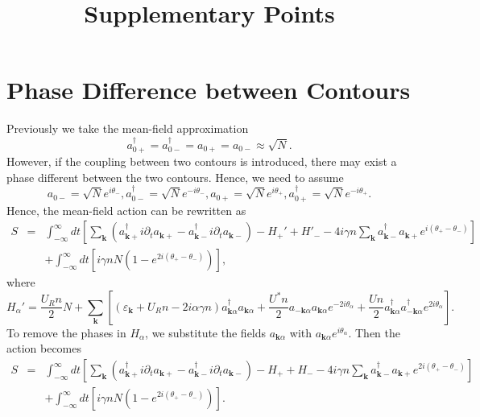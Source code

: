 \documentclass[aps,onecolumn,superscriptaddress,notitlepage,longbibliography]{revtex4-1}
\newcommand{\tmmathbf}[1]{\ensuremath{\boldsymbol{#1}}}
\begin{document}
\title{Supplementary Points}

\maketitle

\section{Phase Difference between Contours}

Previously we take the mean-field approximation
\begin{equation}
  a_{0 +}^{\dagger} = a_{0 -}^{\dagger} = a_{0 +} = a_{0 -} \approx \sqrt{N} .
\end{equation}
However, if the coupling between two contours is introduced, there may exist a
phase different between the two contours. Hence, we need to assume
\begin{equation}
  a_{0 -} = \sqrt{N} e^{i \theta_-}, a_{0 -}^{\dagger} = \sqrt{N} e^{- i
  \theta_-}, a_{0 +} = \sqrt{N} e^{i \theta_+}, a_{0 +}^{\dagger} = \sqrt{N}
  e^{- i \theta_+} .
\end{equation}
Hence, the mean-field action can be rewritten as
\begin{eqnarray}
  S & = & \int_{- \infty}^{\infty} d t \left[ \sum_{\tmmathbf{k}}
  (a^{\dagger}_{\tmmathbf{k}+} i \partial_t a_{\tmmathbf{k}+} -
  a^{\dagger}_{\tmmathbf{k}-} i \partial_t a_{\tmmathbf{k}-}) - H_+' + H'_- -
  4 i \gamma n \sum_{\tmmathbf{k}} a_{\tmmathbf{k}-}^{\dagger}
  a_{\tmmathbf{k}+} e^{i (\theta_+ - \theta_-)} \right] \nonumber\\
  &  & + \int_{- \infty}^{\infty} d t [i \gamma n N (1 - e^{2 i (\theta_+ -
  \theta_-)})], 
\end{eqnarray}
where
\begin{equation}
  H_{\alpha}' = \frac{U_R n}{2} N + \sum_{\tmmathbf{k}} \left[
  (\varepsilon_{\tmmathbf{k}} + U_R n - 2 i \alpha \gamma n) a_{\tmmathbf{k}
  \alpha}^{\dagger} a_{\tmmathbf{k} \alpha} + \frac{U^{\ast} n}{2}
  a_{-\tmmathbf{k} \alpha} a_{\tmmathbf{k} \alpha} e^{- 2 i \theta_{\alpha}} +
  \frac{U n}{2} a_{\tmmathbf{k} \alpha}^{\dagger} a_{-\tmmathbf{k}
  \alpha}^{\dagger} e^{2 i \theta_{\alpha}} \right] .
\end{equation}
To remove the phases in $H_{\alpha}$, we substitute the fields
$a_{\tmmathbf{k} \alpha}$ with $a_{\tmmathbf{k} \alpha} e^{i
\theta_{\alpha}}$. Then the action becomes
\begin{eqnarray}
  S & = & \int_{- \infty}^{\infty} d t \left[ \sum_{\tmmathbf{k}}
  (a^{\dagger}_{\tmmathbf{k}+} i \partial_t a_{\tmmathbf{k}+} -
  a^{\dagger}_{\tmmathbf{k}-} i \partial_t a_{\tmmathbf{k}-}) - H_+ + H_- - 4
  i \gamma n \sum_{\tmmathbf{k}} a_{\tmmathbf{k}-}^{\dagger} a_{\tmmathbf{k}+}
  e^{2 i (\theta_+ - \theta_-)} \right] \nonumber\\
  &  & + \int_{- \infty}^{\infty} d t [i \gamma n N (1 - e^{2 i (\theta_+ -
  \theta_-)})] . 
\end{eqnarray}
\end{document}
